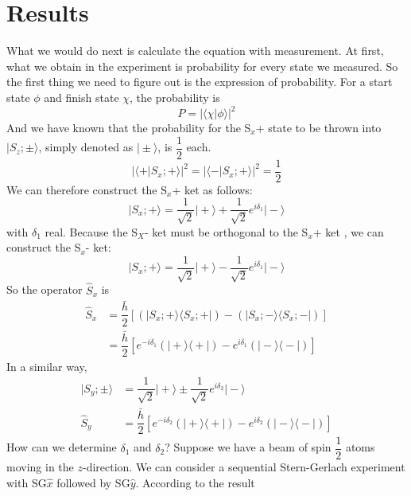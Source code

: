 \documentclass[a4paper]{article}
\newcommand{\ket}[1]{\big|  #1 \big \rangle }
\newcommand{\bra}[1]{ \big\langle #1 \big | }
\begin{document}
\section{Results}
What we would do next is calculate the equation with measurement. 
At first, what we obtain in the experiment is probability for every state we measured. So the first thing we need to figure out is the expression of probability. For a start state $\phi$ and finish state $\chi$, the probability is 
\begin{equation}
P = {| \langle \chi | \phi \rangle |}^2
\end{equation}
And we have known that the probability for the S$_x$+ state to be thrown into $\ket{S_z;\pm}$, simply denoted as $\ket{\pm}$, is $ \dfrac{1}{2} $ each. 
\begin{equation}
{| \langle + | S_x;+ \rangle |}^2 = {| \langle - | S_x;+ \rangle |}^2 = \dfrac{1}{2}
\end{equation}
We can therefore construct the S$_x$+ ket as follows:
\begin{equation}
\ket{S_x;+} = \dfrac{1}{\sqrt{2}} \ket{+} + \dfrac{1}{\sqrt{2}} e^{i\delta_1} \ket{-}
\end{equation}
with $\delta_1$ real. Because the S$_X$- ket must be orthogonal to the S$_x$+ ket , we can  construct the S$_x$- ket:
\begin{equation}
\ket{S_x;+} = \dfrac{1}{\sqrt{2}} \ket{+} - \dfrac{1}{\sqrt{2}} e^{i\delta_1} \ket{-}
\end{equation}
So the operator $\hat{S}_x$ is
\begin{equation}
\begin{aligned}
\hat{S}_x &= \dfrac{\bar{h}}{2} [ (\ket{S_x;+} \bra{S_x;+}) - (\ket{S_x;-} \bra{S_x;-}) ]\\
&= \dfrac{\bar{h}}{2} [ e^{-i \delta_1} (\ket{+} \bra{+}) - e^{i \delta_1} (\ket{-} \bra{-}) ]
\end{aligned}
\end{equation}
In a similar way,
\begin{equation}
\begin{aligned}
\ket{S_y;\pm} &= \dfrac{1}{\sqrt{2}} \ket{+} \pm \dfrac{1}{\sqrt{2}} e^{i\delta_2} \ket{-}\\
\hat{S}_y &= \dfrac{\bar{h}}{2} [ e^{-i \delta_2} (\ket{+} \bra{+}) - e^{i \delta_2} (\ket{-} \bra{-}) ]
\end{aligned}
\end{equation}
How can we determine $\delta_1$ and $\delta_2$? Suppose we have a beam of spin $\dfrac{1}{2}$ atoms moving in the $z$-direction. We can consider a sequential Stern-Gerlach experiment with SG$\hat{x}$ followed by SG$\hat{y}$. According to the result
\end{document}
